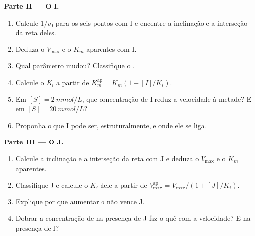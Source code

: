 \begin{problem}
\medskip
\noindent\textbf{Parte II --- O  I.}
\begin{enumerate}[resume]
  \item Calcule $1/v_0$ para os seis pontos com I e encontre a
        inclinação e a interseção da reta deles.
  \item Deduza o $V_{\max}$ e o $K_m$ aparentes com I.
  \item Qual parâmetro mudou? Classifique o .
  \item Calcule o $K_i$ a partir de $K_m^{\text{ap}} = K_m(1 + [I]/K_i)$.
  \item Em $[S] = \qty{2}{mmol/L}$, que concentração de I reduz a
        velocidade à metade? E em $[S] = \qty{20}{mmol/L}$?
  \item Proponha o que I pode ser, estruturalmente, e onde ele se liga.
\end{enumerate}

\medskip
\noindent\textbf{Parte III --- O  J.}
\begin{enumerate}[resume]
  \item Calcule a inclinação e a interseção da reta com J e deduza o
        $V_{\max}$ e o $K_m$ aparentes.
  \item Classifique J e calcule o $K_i$ dele a partir de
        $V_{\max}^{\text{ap}} =
        V_{\max}/(1 + [J]/K_i)$.
  \item Explique por que aumentar o  não vence J.
  \item Dobrar a concentração de  na presença de J faz o quê com a
        velocidade? E na presença de I?
\end{enumerate}


\end{problem}
